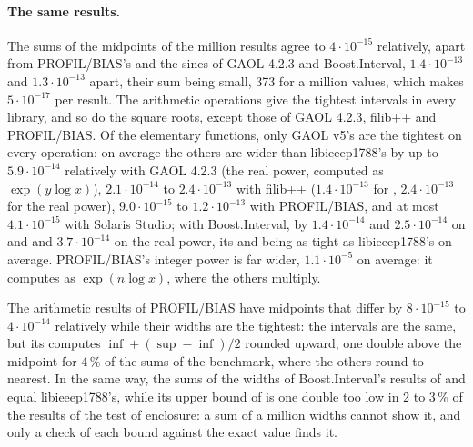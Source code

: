 \paragraph{The same results.}
The sums of the midpoints of the million results agree to $4\cdot10^{-15}$
relatively, apart from PROFIL/BIAS's and the sines of GAOL 4.2.3 and
Boost.Interval, $1.4\cdot10^{-13}$ and $1.3\cdot10^{-13}$ apart, their sum
being small, 373 for a million values, which makes $5\cdot10^{-17}$ per
result. The arithmetic operations give the tightest intervals in every
library, and so do the square roots, except those of GAOL 4.2.3, filib++ and
PROFIL/BIAS. Of the elementary functions, only GAOL v5's are the tightest on
every operation: on average the others are wider than libieeep1788's by up
to $5.9\cdot10^{-14}$ relatively with GAOL 4.2.3 (the real power, computed
as $\exp(y \log x)$), $2.1\cdot10^{-14}$ to $2.4\cdot10^{-13}$ with filib++ ($1.4\cdot10^{-13}$ for , $2.4\cdot10^{-13}$ for the real power), $9.0\cdot10^{-15}$ to $1.2\cdot10^{-13}$ with PROFIL/BIAS, and at most $4.1\cdot10^{-15}$ with Solaris Studio; with Boost.Interval, by
$1.4\cdot10^{-14}$ and $2.5\cdot10^{-14}$ on  and  and
$3.7\cdot10^{-14}$ on the real power, its  and  being as
tight as libieeep1788's on average. PROFIL/BIAS's integer power is far
wider, $1.1\cdot10^{-5}$ on average: it computes  as
$\exp(n \log x)$, where the others multiply.

\begin{Rem}
The arithmetic results of PROFIL/BIAS have midpoints that differ by
$8\cdot10^{-15}$ to $4\cdot10^{-14}$ relatively while their widths are the
tightest: the intervals are the same, but its  computes
$\inf + (\sup - \inf)/2$ rounded upward, one double above the midpoint for
4\,\% of the sums of the benchmark, where the others round to nearest. In
the same way, the sums of the widths of Boost.Interval's results of
 and  equal libieeep1788's, while its upper bound of
 is one double too low in 2 to 3\,\% of the results of the test of
enclosure: a sum of a million widths cannot show it, and only a check of
each bound against the exact value finds it.
\end{Rem}


